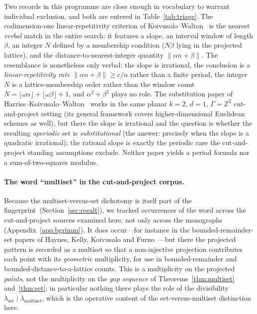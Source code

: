 \documentclass[11pt]{article}
\theoremstyle{plain}
\theoremstyle{remark}
\newcommand{\Z}{\mathbb{Z}}
\newcommand{\lmult}{\lambda_{\mathrm{multiset}}}
\newcommand{\lset}{\lambda_{\mathrm{set}}}
\begin{document}
Two records in this programme are close enough in vocabulary to warrant individual
exclusion, and both are entered in Table~\ref{tab:triage}. The codimension-one
linear-repetitivity criterion of Koivusalo--Walton~\cite{KoivusaloWalton2020} is the
nearest \emph{verbal} match in the entire search: it features a slope, an interval
window of length $\beta$, an integer $N$ defined by a membership condition ($N\beta$
lying in the projected lattice), and the distance-to-nearest-integer quantity
$\lVert\alpha n+\beta\rVert$. The resemblance is nonetheless only verbal: the slope
is irrational, the conclusion is a \emph{linear-repetitivity rate}
$\lVert\alpha n+\beta\rVert\ge c/n$ rather than a finite period, the integer $N$ is a
lattice-membership order rather than the window count
$N=\lfloor\omega\alpha\rfloor+\lfloor\omega\beta\rfloor+1$, and $\alpha^2+\beta^2$
plays no role. The substitution paper of
Harriss--Koivusalo--Walton~\cite{HarrissKoivusaloWalton2025} works in the same
planar $k=2$, $d=1$, $\Gamma=\Z^2$ cut-and-project setting (its general framework
covers higher-dimensional Euclidean schemes as well), but there the slope is
irrational and the question
is whether the resulting \emph{aperiodic} set is \emph{substitutional} (the answer:
precisely when the slope is a quadratic irrational); the rational slope is exactly
the periodic case the cut-and-project standing assumptions exclude. Neither paper
yields a period formula nor a sum-of-two-squares modulus.

\paragraph{The word ``multiset'' in the cut-and-project corpus.}
Because the multiset-versus-set dichotomy is itself part of the
fingerprint~(Section~\ref{sec:result}), we tracked occurrences of the word across the
cut-and-project sources examined here, not only across the monographs
(Appendix~\ref{app:bgrimm}). It does occur---for instance in the
bounded-remainder-set papers of Haynes, Kelly, Koivusalo and
Furno~\cite{HaynesKellyKoivusalo2016,FurnoHaynesKoivusalo2018}---but there the
projected pattern is recorded as a multiset so that a non-injective projection
contributes each point with its \emph{geometric} multiplicity, for use in
bounded-remainder and bounded-distance-to-a-lattice counts. This is a multiplicity on
the projected \emph{points}, not the multiplicity on the \emph{gap sequence} of
Theorems~\ref{thm:multiset} and~\ref{thm:set}; in particular nothing there plays the
role of the divisibility $\lset\mid\lmult$, which is the operative content of the
set-versus-multiset distinction here.
\end{document}
